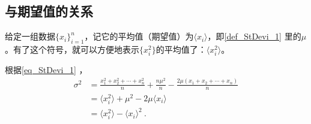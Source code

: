 \subsection{与期望值的关系}

给定一组数据$\{x_i\}_{i=1}^n$，记它的平均值（期望值）为$\langle x_i \rangle$，即\autoref{def_StDevi_1} 里的$\mu$。有了这个符号，就可以方便地表示$\{x_i^2\}$的平均值了：$\langle x_i^2 \rangle$。

根据\autoref{eq_StDevi_1} ，
\begin{equation}
\begin{aligned}
\sigma^2 &= \frac{x_1^2+x_2^2+\cdots+x_n^2}{n}+\frac{n\mu^2}{n}-\frac{2\mu(x_1+x_2+\cdots+x_n)}{n}\\
&=\langle x_i^2 \rangle+\mu^2-2\mu\langle x_i \rangle\\
&=\langle x_i^2 \rangle-\langle x_i \rangle^2~.
\end{aligned}
\end{equation}
